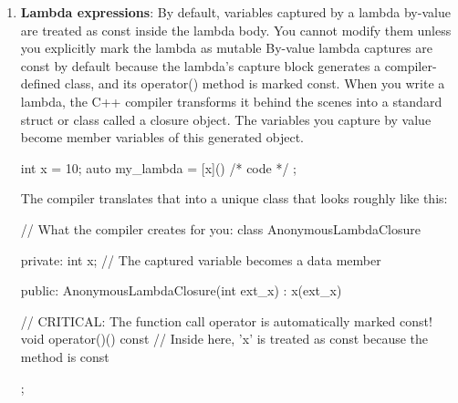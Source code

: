\documentclass{report}
\begin{document}
\begin{itemize}
\begin{enumerate}
\begin{cppcode}
{                        std::cout << wizard.getExpensiveCalculation() << "\n"; // Computes
                        std::cout << wizard.getExpensiveCalculation() << "\n"; // Uses cache
                    }
                    \end{cppcode}
                    \bigbreak \noindent 
                    Mutable provides no thread safety. If multiple threads increment hits without synchronization, there is a data race and therefore undefined behavior. Thread safety would require something such as:
                \item \textbf{Lambda expressions}: By default, variables captured by a lambda by-value are treated as const inside the lambda body. You cannot modify them unless you explicitly mark the lambda as mutable
                    \bigbreak \noindent 
                    By-value lambda captures are const by default because the lambda’s capture block generates a compiler-defined class, and its operator() method is marked const.
                    \bigbreak \noindent 
                    When you write a lambda, the C++ compiler transforms it behind the scenes into a standard struct or class called a closure object. The variables you capture by value become member variables of this generated object.
                    \bigbreak \noindent 
                    \begin{cppcode}
                        int x = 10;
                        auto my_lambda = [x]() { /* code */ };
                    \end{cppcode}
                    \bigbreak \noindent 
                    The compiler translates that into a unique class that looks roughly like this:
                    \bigbreak \noindent 
                    \begin{cppcode}
                        // What the compiler creates for you:
                        class AnonymousLambdaClosure {
                        private:
                            int x; // The captured variable becomes a data member

                            public:
                            AnonymousLambdaClosure(int ext_x) : x(ext_x) {}

                            // CRITICAL: The function call operator is automatically marked const!
                            void operator()() const { 
                                // Inside here, 'x' is treated as const because the method is const
                            }
                        };


\end{cppcode}
\end{enumerate}
\end{itemize}
\end{document}
